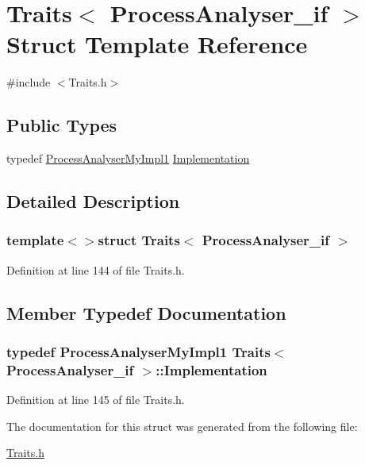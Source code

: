 \hypertarget{struct_traits_3_01_process_analyser__if_01_4}{\section{Traits$<$ Process\-Analyser\-\_\-if $>$ Struct Template Reference}
\label{struct_traits_3_01_process_analyser__if_01_4}
}


{\ttfamily \#include $<$Traits.\-h$>$}

\subsection*{Public Types}
\begin{DoxyCompactItemize}
\item 
typedef \hyperlink{class_process_analyser_my_impl1}{Process\-Analyser\-My\-Impl1} \hyperlink{struct_traits_3_01_process_analyser__if_01_4_a07937b53ae16bb3a41301a0393ac679f}{Implementation}
\end{DoxyCompactItemize}


\subsection{Detailed Description}
\subsubsection*{template$<$$>$struct Traits$<$ Process\-Analyser\-\_\-if $>$}



Definition at line 144 of file Traits.\-h.



\subsection{Member Typedef Documentation}
\hypertarget{struct_traits_3_01_process_analyser__if_01_4_a07937b53ae16bb3a41301a0393ac679f}{
\subsubsection[{Implementation}]{\setlength{\rightskip}{0pt plus 5cm}typedef {\bf Process\-Analyser\-My\-Impl1} {\bf Traits}$<$ {\bf Process\-Analyser\-\_\-if} $>$\-::{\bf Implementation}}}\label{struct_traits_3_01_process_analyser__if_01_4_a07937b53ae16bb3a41301a0393ac679f}


Definition at line 145 of file Traits.\-h.



The documentation for this struct was generated from the following file\-:\begin{DoxyCompactItemize}
\item 
\hyperlink{_traits_8h}{Traits.\-h}\end{DoxyCompactItemize}
